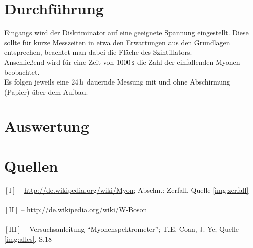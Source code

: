 \documentclass[numbers=noenddot,12pt,a4paper]{scrartcl}
\newcommand{\num}[1]{$\left[\text{#1}\right]$}
\begin{document}
\section{Durchführung}
Eingangs wird der Diskriminator auf eine geeignete Spannung eingestellt. Diese sollte für kurze Messzeiten in etwa den Erwartungen aus den Grundlagen entsprechen, beachtet man dabei die Fläche des Szintillators.\\
Anschließend wird für eine Zeit von $\unit[1000]{s}$ die Zahl der einfallenden Myonen beobachtet.\\
Es folgen jeweils eine $\unit[24]{h}$ dauernde Messung mit und ohne Abschirmung (Papier) über dem Aufbau.
\newpage
\section{Auswertung}
\section{Quellen}
\num{I} -- \url{http://de.wikipedia.org/wiki/Myon}; Abschn.: Zerfall, Quelle \ref{img:zerfall} \\ \\
\num{II} -- \url{http://de.wikipedia.org/wiki/W-Boson}\\ \\
\num{III} -- Versuchsanleitung "`Myonenspektrometer"'; T.E. Coan, J. Ye; Quelle \ref{img:alles}, S.18\\ \\
\end{document}
